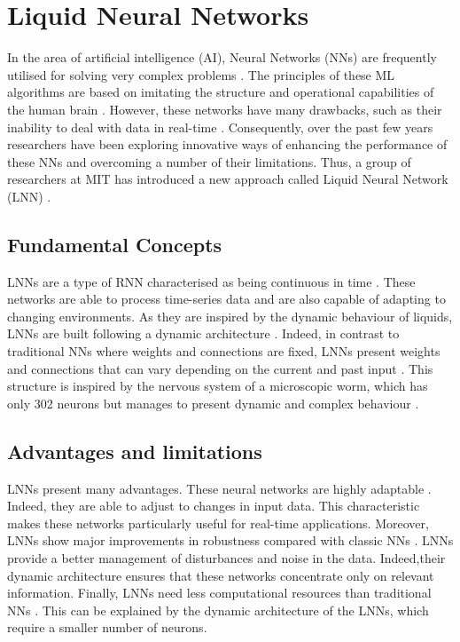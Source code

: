 \documentclass[12pt,oneside]{book} %
\begin{document}
\section{Liquid Neural Networks}

\noindent In the area of artificial intelligence (AI), Neural Networks (NNs) are frequently utilised for solving very complex problems \cite{Sajid}. The principles of these ML algorithms are based on imitating the structure and operational capabilities of the human brain \cite{Sajid}. However, these networks have many drawbacks, such as their inability to deal with data in real-time \cite{Sajid}. Consequently, over the past few years researchers have been exploring innovative ways of enhancing the performance of these NNs and overcoming a number of their limitations. Thus, a group of researchers at MIT has introduced a new approach called Liquid Neural Network (LNN) \cite{Sajid}.

\subsection{Fundamental Concepts}

\noindent LNNs are a type of RNN characterised as being continuous in time \citep{Boesch,Keary,Sajid}. These networks are able to process time-series data and are also capable of adapting to changing environments. As they are inspired by the dynamic behaviour of liquids, LNNs are built following a dynamic architecture \cite{Tyagi}. Indeed, in contrast to traditional NNs where weights and connections are fixed, LNNs present weights and connections that can vary depending on the current and past input \cite{Keary}. This structure is inspired by the nervous system of a microscopic worm, which has only 302 neurons but manages to present dynamic and complex behaviour \citep{Boesch,Sajid}.

\subsection{Advantages and limitations}

\noindent LNNs present many advantages. These neural networks are highly adaptable \citep{Tyagi,Keary}. Indeed, they are able to adjust to changes in input data. This characteristic makes these networks particularly useful for real-time applications. Moreover, LNNs show major improvements in robustness compared with classic NNs \citep{Tyagi,Keary}. LNNs provide a better management of disturbances and noise in the data. Indeed,their dynamic architecture ensures that these networks concentrate only on relevant information. Finally, LNNs need less computational resources than traditional NNs \cite{Keary}. This can be explained by the dynamic architecture of the LNNs, which require a smaller number of neurons.
\end{document}

